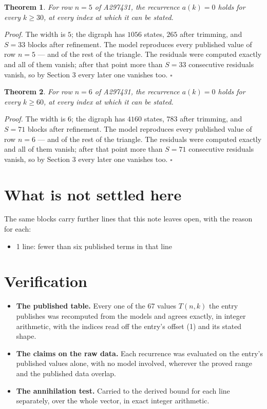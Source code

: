 \documentclass[11pt]{article}
\newtheorem{theorem}{Theorem}
\theoremstyle{definition}
\begin{document}
\begin{theorem} For row $n = 5$ of A297431, the recurrence $a(k) = 0$ holds for every $k \ge 30$, at every index at which it can be stated.\end{theorem}

{\itshape Proof.} The width is $5$; the digraph has $1056$ states, $265$ after trimming, and $S = 33$ blocks after refinement. The model reproduces every published value of row $n = 5$ --- and of the rest of the triangle. The residuals were computed exactly and all of them vanish; after that point more than $S = 33$ consecutive residuals vanish, so by Section 3 every later one vanishes too. $\square$

\begin{theorem} For row $n = 6$ of A297431, the recurrence $a(k) = 0$ holds for every $k \ge 60$, at every index at which it can be stated.\end{theorem}

{\itshape Proof.} The width is $6$; the digraph has $4160$ states, $783$ after trimming, and $S = 71$ blocks after refinement. The model reproduces every published value of row $n = 6$ --- and of the rest of the triangle. The residuals were computed exactly and all of them vanish; after that point more than $S = 71$ consecutive residuals vanish, so by Section 3 every later one vanishes too. $\square$

\section{What is not settled here}

The same blocks carry further lines that this note leaves open, with the reason for each:

\begin{itemize}

\item 1 line: fewer than six published terms in that line

\end{itemize}

\section{Verification}

\begin{itemize}

\item {\bfseries The published table.} Every one of the 67 values $T(n,k)$ the entry publishes was recomputed from the models and agrees exactly, in integer arithmetic, with the indices read off the entry's offset (1) and its stated shape.

\item {\bfseries The claims on the raw data.} Each recurrence was evaluated on the entry's published values alone, with no model involved, wherever the proved range and the published data overlap.

\item {\bfseries The annihilation test.} Carried to the derived bound for each line separately, over the whole vector, in exact integer arithmetic.

\end{itemize}
\end{document}
